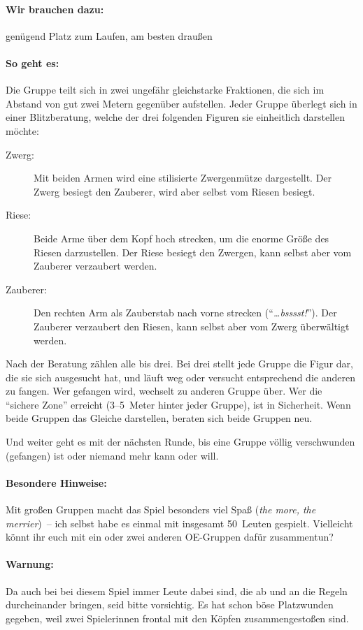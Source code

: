 \paragraph{Wir brauchen dazu:} genügend Platz zum Laufen, am besten draußen
\paragraph{So geht es:} Die Gruppe teilt sich in zwei ungefähr gleichstarke Fraktionen, die sich im Abstand von gut zwei Metern gegenüber aufstellen. Jeder Gruppe überlegt sich in einer Blitzberatung, welche der drei folgenden Figuren sie einheitlich darstellen möchte:
\begin{description}
  \item[Zwerg:] Mit beiden Armen wird eine stilisierte Zwergenmütze dargestellt. Der Zwerg besiegt den Zauberer, wird aber selbst vom Riesen besiegt.
  \item[Riese:] Beide Arme über dem Kopf hoch strecken, um die enorme Größe des Riesen darzustellen. Der Riese besiegt den Zwergen, kann selbst aber vom Zauberer verzaubert werden.
  \item[Zauberer:] Den rechten Arm als Zauberstab nach vorne strecken ("`\emph{\ldots bsssst!}"'). Der Zauberer verzaubert den Riesen, kann selbst aber vom Zwerg überwältigt werden.
\end{description}
Nach der Beratung zählen alle bis drei. Bei drei stellt jede Gruppe die Figur dar, die sie sich ausgesucht hat, und läuft weg oder versucht entsprechend die anderen zu fangen. Wer gefangen wird, wechselt zu anderen Gruppe über. Wer die "`sichere Zone"' erreicht (3--5~Meter hinter jeder Gruppe), ist in Sicherheit. Wenn beide Gruppen das Gleiche darstellen, beraten sich beide Gruppen neu.

Und weiter geht es mit der nächsten Runde, bis eine Gruppe völlig verschwunden (gefangen) ist oder niemand mehr kann oder will.
\paragraph{Besondere Hinweise:} Mit großen Gruppen macht das Spiel besonders viel Spaß (\emph{the more, the merrier})~-- ich selbst habe es einmal mit insgesamt 50~Leuten gespielt. Vielleicht könnt ihr euch mit ein oder zwei anderen OE-Gruppen dafür zusammentun?
\paragraph{Warnung:} Da auch bei bei diesem Spiel immer Leute dabei sind, die ab und an die Regeln durcheinander bringen, seid bitte vorsichtig. Es hat schon böse Platzwunden gegeben, weil zwei Spielerinnen frontal mit den Köpfen zusammengestoßen sind.
